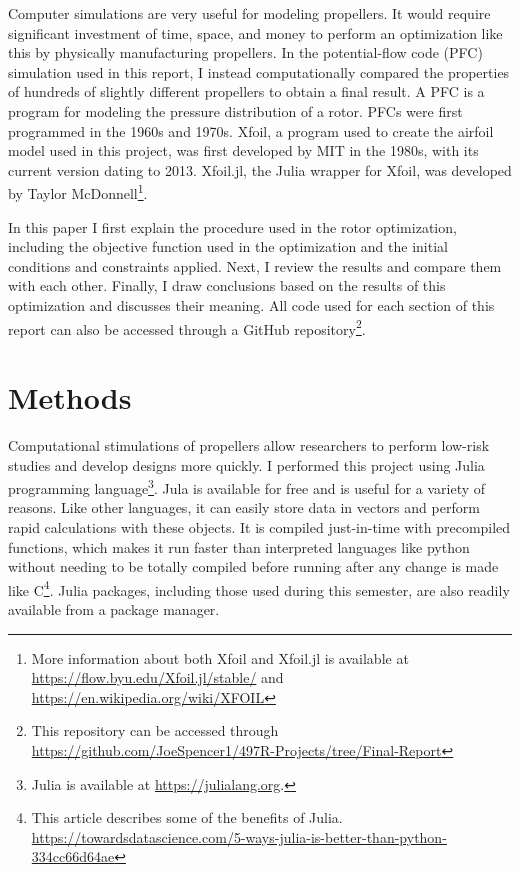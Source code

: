 \documentclass[journal ]{new-aiaa}
\begin{document}
Computer simulations are very useful for modeling propellers. It would require significant investment of time, space, and money to perform an optimization like this by physically manufacturing propellers. In the potential-flow code (PFC) simulation used in this report, I instead computationally compared the properties of hundreds of slightly different propellers to obtain a final result. A PFC is a program for modeling the pressure distribution of a rotor. PFCs were first programmed in the 1960s and 1970s. Xfoil, a program used to create the airfoil model used in this project, was first developed by MIT in the 1980s, with its current version dating to 2013. Xfoil.jl, the Julia wrapper for Xfoil, was developed by Taylor McDonnell\footnote{More information about both Xfoil and Xfoil.jl is available at \url{https://flow.byu.edu/Xfoil.jl/stable/} and \url{https://en.wikipedia.org/wiki/XFOIL}}.

In this paper I first explain the procedure used in the rotor optimization, including the objective function used in the optimization and the initial conditions and constraints applied. Next, I review the results and compare them with each other. Finally, I draw conclusions based on the results of this optimization and discusses their meaning. All code used for each section of this report can also be accessed through a GitHub repository\footnote{This repository can be accessed through \url{https://github.com/JoeSpencer1/497R-Projects/tree/Final-Report}}.


\section{Methods}

Computational stimulations of propellers allow researchers to perform low-risk studies and develop designs more quickly. I performed this project using Julia programming language\footnote{Julia is available at \url{https://julialang.org}.}. Jula is available for free and is useful for a variety of reasons. Like other languages, it can easily store data in vectors and perform rapid calculations with these objects. It is compiled just-in-time with precompiled functions, which makes it run faster than interpreted languages like python without needing to be totally compiled before running after any change is made like C\footnote{This article describes some of the benefits of Julia. \url{https://towardsdatascience.com/5-ways-julia-is-better-than-python-334cc66d64ae}}. Julia  packages, including those used during this semester, are also readily available from a package manager.
\end{document}
